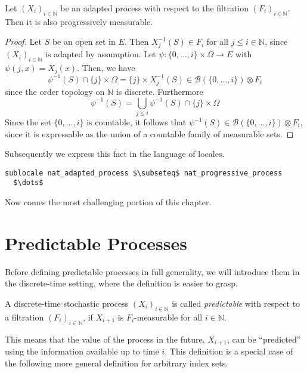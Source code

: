 \begin{lemma}
	Let $(X_i)_{i \in \mathbb{N}}$ be an adapted process with respect to the filtration $(F_i)_{i \in \mathbb{N}}$. Then it is also progressively measurable.
\end{lemma}
\begin{proof}
	Let $S$ be an open set in $E$. Then $X_j^{-1}(S) \in F_i$ for all $j \le i \in \mathbb{N}$, since $(X_i)_{i \in \mathbb{N}}$ is adapted by assumption. Let $\psi : \{0,\dots,i\} \times \Omega \rightarrow E$ with $\psi(j,x) = X_j(x)$. Then, we have
	\[
		\psi^{-1}(S) \cap \{j\} \times \Omega = \{j\} \times X_j^{-1}(S) \in \mathcal{B}(\{0,\dots,i\}) \otimes F_i
	\]
	since the order topology on $\mathbb{N}$ is discrete. Furthermore
	\[
		\psi^{-1}(S) = \bigcup_{j \le i} \psi^{-1}(S) \cap \{j\} \times \Omega 
	\]
	Since the set $\{0,\dots,i\}$ is countable, it follows that $\psi^{-1}(S) \in \mathcal{B}(\{0,\dots,i\}) \otimes F_i$, since it is expressable as the union of a countable family of measurable sets.
\end{proof}

Subsequently we express this fact in the language of locales.

\begin{isalemma}
{\small
\begin{lstlisting}[style=isabelle]
sublocale nat_adapted_process $\subseteq$ nat_progressive_process
  $\dots$
\end{lstlisting}
}
\end{isalemma}

Now comes the most challenging portion of this chapter.

\section{Predictable Processes}

Before defining predictable processes in full generality, we will introduce them in the discrete-time setting, where the definition is easier to grasp.

\begin{definition}
	A discrete-time stochastic process $(X_i)_{i\in\mathbb{N}}$ is called \textit{predictable} with respect to a filtration $(F_i)_{i\in\mathbb{N}}$, if $X_{i + 1}$ is $F_i$-measurable for all $i \in \mathbb{N}$.
\end{definition}

This means that the value of the process in the future, $X_{i+1}$, can be ``predicted'' using the information available up to time $i$. This definition is a special case of the following more general definition for arbitrary index sets.

